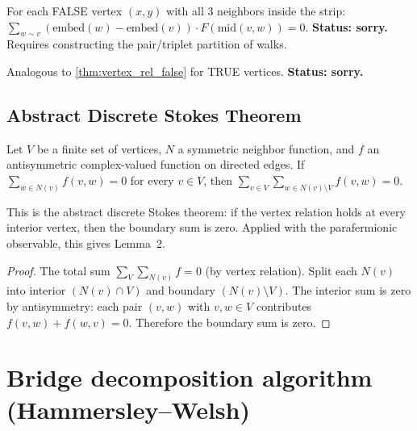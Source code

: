 \begin{theorem}\label{thm:vertex_rel_false}
  For each FALSE vertex $(x,y)$ with all 3 neighbors inside the strip:
  $\sum_{w \sim v} (\text{embed}(w) - \text{embed}(v)) \cdot F(\text{mid}(v,w)) = 0$.
  \textbf{Status: sorry.} Requires constructing the pair/triplet partition of walks.
\end{theorem}

\begin{theorem}\label{thm:vertex_rel_true}
  Analogous to \ref{thm:vertex_rel_false} for TRUE vertices.
  \textbf{Status: sorry.}
\end{theorem}

\subsection{Abstract Discrete Stokes Theorem}

\begin{theorem}\label{thm:discrete_stokes}
\leanok
  Let $V$ be a finite set of vertices, $N$ a symmetric neighbor function,
  and $f$ an antisymmetric complex-valued function on directed edges.
  If $\sum_{w \in N(v)} f(v,w) = 0$ for every $v \in V$, then
  $\sum_{v \in V} \sum_{w \in N(v) \setminus V} f(v,w) = 0$.

  This is the abstract discrete Stokes theorem: if the vertex relation
  holds at every interior vertex, then the boundary sum is zero.
  Applied with the parafermionic observable, this gives Lemma~2.
\end{theorem}
\begin{proof}
\leanok
  The total sum $\sum_V \sum_{N(v)} f = 0$ (by vertex relation).
  Split each $N(v)$ into interior $(N(v) \cap V)$ and boundary $(N(v) \setminus V)$.
  The interior sum is zero by antisymmetry: each pair $(v,w)$ with
  $v, w \in V$ contributes $f(v,w) + f(w,v) = 0$.
  Therefore the boundary sum is zero.
\end{proof}

\section{Bridge decomposition algorithm (Hammersley--Welsh)}\label{sec:hw_algorithm}

